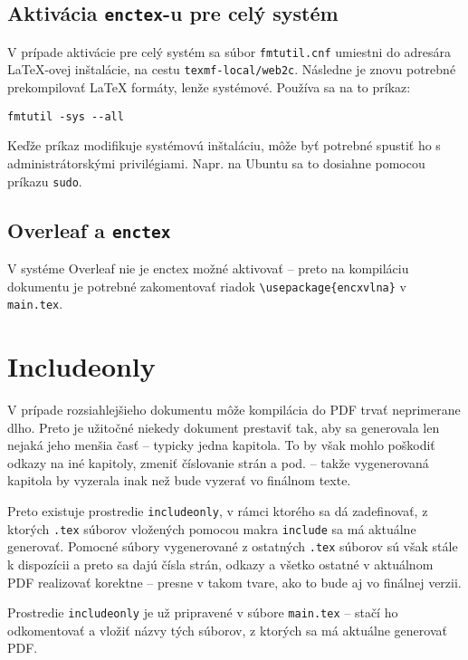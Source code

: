 \subsection{Aktivácia \texttt{enctex}-u pre celý systém}

V prípade aktivácie pre celý systém sa súbor \texttt{fmtutil.cnf} umiestni do adresára LaTeX-ovej inštalácie, na cestu \texttt{texmf-local/web2c}. Následne je znovu potrebné prekompilovať LaTeX formáty, lenže systémové. Používa sa na to príkaz:
\begin{Verbatim}
fmtutil -sys --all
\end{Verbatim}
Keďže príkaz modifikuje systémovú inštaláciu, môže byť potrebné spustiť ho s administrátorskými privilégiami. Napr. na Ubuntu sa to dosiahne pomocou príkazu \texttt{sudo}.

\subsection{Overleaf a \texttt{enctex}}

V systéme Overleaf nie je enctex možné aktivovať -- preto na kompiláciu dokumentu je potrebné zakomentovať riadok \texttt{\textbackslash{usepackage}\{encxvlna\}} v \texttt{main.tex}.

\section{Includeonly}

V prípade rozsiahlejšieho dokumentu môže kompilácia do PDF trvať neprimerane dlho. Preto je užitočné niekedy dokument prestaviť tak, aby sa generovala len nejaká jeho menšia časť -- typicky jedna kapitola. To by však mohlo poškodiť odkazy na iné kapitoly, zmeniť číslovanie strán a pod. -- takže vygenerovaná kapitola by vyzerala inak než bude vyzerať vo finálnom texte.

Preto existuje prostredie \texttt{includeonly}, v rámci ktorého sa dá zadefinovať, z ktorých \texttt{.tex} súborov vložených pomocou makra \texttt{include} sa má aktuálne generovať. Pomocné súbory vygenerované z ostatných \texttt{.tex} súborov sú však stále k dispozícii a preto sa dajú čísla strán, odkazy a všetko ostatné v aktuálnom PDF realizovať korektne -- presne v takom tvare, ako to bude aj vo finálnej verzii.

Prostredie \texttt{includeonly} je už pripravené v súbore \texttt{main.tex} -- stačí ho odkomentovať a vložiť názvy tých súborov, z ktorých sa má aktuálne generovať PDF.
